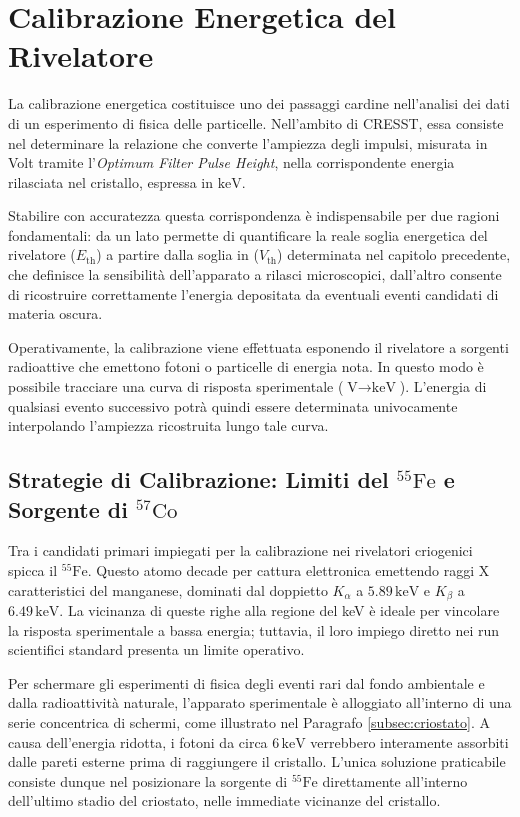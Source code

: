 \chapter{Calibrazione Energetica del Rivelatore}
\label{ch:calibrazione}

La calibrazione energetica costituisce uno dei passaggi cardine nell'analisi dei dati di un esperimento di fisica delle particelle. Nell'ambito di CRESST, essa consiste nel determinare la relazione che converte l'ampiezza degli impulsi, misurata in Volt tramite l'\textit{Optimum Filter Pulse Height}, nella corrispondente energia rilasciata nel cristallo, espressa in $\text{keV}$. 

Stabilire con accuratezza questa corrispondenza è indispensabile per due ragioni fondamentali: da un lato permette di quantificare la reale soglia energetica del rivelatore ($E_{\text{th}}$) a partire dalla soglia in  ($V_{\text{th}}$) determinata nel capitolo precedente, che definisce la sensibilità dell'apparato a rilasci microscopici, dall'altro consente di ricostruire correttamente l'energia depositata da eventuali eventi candidati di materia oscura.

Operativamente, la calibrazione viene effettuata esponendo il rivelatore a sorgenti radioattive che emettono fotoni o particelle di energia nota. In questo modo è possibile tracciare una curva di risposta sperimentale ($\text{V} \rightarrow \text{keV}$). L'energia di qualsiasi evento successivo potrà quindi essere determinata univocamente interpolando l'ampiezza ricostruita lungo tale curva.

\section{Strategie di Calibrazione: Limiti del $^{55}\text{Fe}$ e Sorgente di $^{57}\text{Co}$}
\label{sec:strategie_calibrazione}

Tra i candidati primari impiegati per la calibrazione nei rivelatori criogenici spicca il $^{55}\text{Fe}$. Questo atomo decade per cattura elettronica emettendo raggi X caratteristici del manganese, dominati dal doppietto $K_\alpha$ a $5.89\,\text{keV}$ e $K_\beta$ a $6.49\,\text{keV}$. La vicinanza di queste righe alla regione del keV è ideale per vincolare la risposta sperimentale a bassa energia; tuttavia, il loro impiego diretto nei run scientifici standard presenta un limite operativo.

Per schermare gli esperimenti di fisica degli eventi rari dal fondo ambientale e dalla radioattività naturale, l'apparato sperimentale è alloggiato all'interno di una serie concentrica di schermi, come illustrato nel Paragrafo \ref{subsec:criostato}. A causa dell'energia ridotta, i fotoni da circa $6\,\text{keV}$ verrebbero interamente assorbiti dalle pareti esterne prima di raggiungere il cristallo. L'unica soluzione praticabile consiste dunque nel posizionare la sorgente di $^{55}\text{Fe}$ direttamente all'interno dell'ultimo stadio del criostato, nelle immediate vicinanze del cristallo. 

